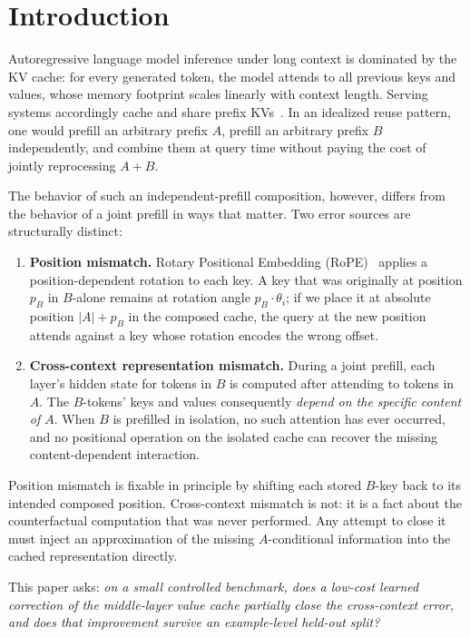 \section{Introduction}

Autoregressive language model inference under long context is dominated by the KV cache: for every generated token, the model attends to all previous keys and values, whose memory footprint scales linearly with context length. Serving systems accordingly cache and share prefix KVs~\citep{kwon2023vllm,zheng2024sglang,gim2023prompt}. In an idealized reuse pattern, one would prefill an arbitrary prefix $A$, prefill an arbitrary prefix $B$ independently, and combine them at query time without paying the cost of jointly reprocessing $A+B$.

The behavior of such an independent-prefill composition, however, differs from the behavior of a joint prefill in ways that matter. Two error sources are structurally distinct:

\begin{enumerate}[leftmargin=*]
    \item \textbf{Position mismatch.} Rotary Positional Embedding (RoPE)~\citep{su2021roformer} applies a position-dependent rotation to each key. A key that was originally at position $p_B$ in $B$-alone remains at rotation angle $p_B \cdot \theta_i$; if we place it at absolute position $|A| + p_B$ in the composed cache, the query at the new position attends against a key whose rotation encodes the wrong offset.
    \item \textbf{Cross-context representation mismatch.} During a joint prefill, each layer's hidden state for tokens in $B$ is computed after attending to tokens in $A$. The $B$-tokens' keys and values consequently \emph{depend on the specific content of $A$}. When $B$ is prefilled in isolation, no such attention has ever occurred, and no positional operation on the isolated cache can recover the missing content-dependent interaction.
\end{enumerate}

Position mismatch is fixable in principle by shifting each stored $B$-key back to its intended composed position. Cross-context mismatch is not: it is a fact about the counterfactual computation that was never performed. Any attempt to close it must inject an approximation of the missing $A$-conditional information into the cached representation directly.

This paper asks: \emph{on a small controlled benchmark, does a low-cost learned correction of the middle-layer value cache partially close the cross-context error, and does that improvement survive an example-level held-out split?}

